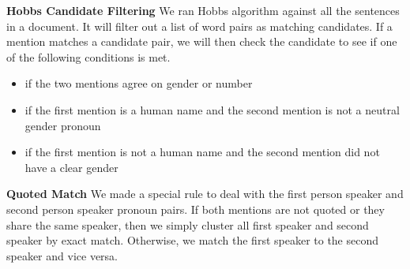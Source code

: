 \documentclass[letterpaper]{article}
\begin{document}
\textbf{Hobbs Candidate Filtering}
We ran Hobbs algorithm against all the sentences in a document. It will filter out a list of word pairs as matching candidates. If a mention matches a candidate pair, we will then check the candidate to see if one of the following conditions is met.
\begin{itemize}
\item if the two mentions agree on gender or number
\item if the first mention is a human name and the second mention is not a neutral gender pronoun
\item if the first mention is not a human name and the second mention did not have a clear gender
\end{itemize}
\textbf{Quoted Match} We made a special rule to deal with the first person speaker and second person speaker pronoun pairs. If both mentions are not quoted or they share the same speaker, then we simply cluster all first speaker and second speaker by exact match. Otherwise, we match the first speaker to the second speaker and vice versa.
\end{document}

